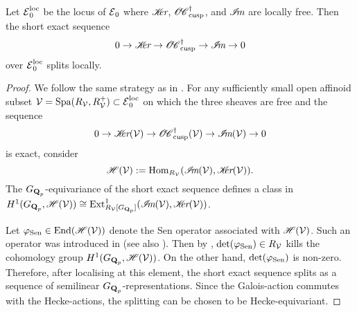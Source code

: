 \begin{Theorem}\label{Theorem: local spliting of OES} Let $\calE_0^{\loc}$ be the locus of $\calE_0$ where $\sheafKer$, $\sheafOC_{\cusp}^{\dagger}$, and $\sheafIm$ are locally free. Then the short exact sequence $$0\rightarrow \sheafKer\rightarrow \sheafOC_{\cusp}^{\dagger}\rightarrow \sheafIm\rightarrow 0$$ over $\calE_0^{\loc}$ splits locally.
\end{Theorem}
\begin{proof}
We follow the same strategy as in \cite[Theorem 6.1(c)]{AIS-2015}. For any sufficiently small open affinoid subset $\calV=\Spa(R_{\calV}, R_{\calV}^+)\subset \calE_0^{\loc}$ on which the three sheaves are free and the sequence $$0\rightarrow \sheafKer(\calV)\rightarrow \sheafOC_{\cusp}^{\dagger}(\calV)\rightarrow \sheafIm(\calV)\rightarrow 0$$ is exact, consider $$\scrH(\calV):=\Hom_{R_{\calV}}(\sheafIm(\calV), \sheafKer(\calV)).$$ The $G_{\Q_p}$-equivariance of the short exact sequence defines a class in $H^1(G_{\Q_p}, \scrH(\calV))\cong \text{Ext}^1_{R_{\calV}[G_{\Q_p}]}(\sheafIm(\calV), \sheafKer(\calV))$.

Let $\varphi_{\Sen}\in \End(\scrH(\calV))$ denote the Sen operator associated with $\scrH(\calV)$. Such an operator was introduced in \cite{Sen-analytic} (see also \cite{Kisin-2003}). Then by \cite[Proposition 2.3]{Kisin-2003}, $\det(\varphi_{\Sen})\in R_{\calV}$ kills the cohomology group $H^1(G_{\Q_p}, \scrH(\calV))$. On the other hand, $\det(\varphi_{\Sen})$ is non-zero. Therefore, after localising at this element, the short exact sequence splits as a sequence of semilinear $G_{\Q_p}$-representations. Since the Galois-action commutes with the Hecke-actions, the splitting can be chosen to be Hecke-equivariant. 
\end{proof}